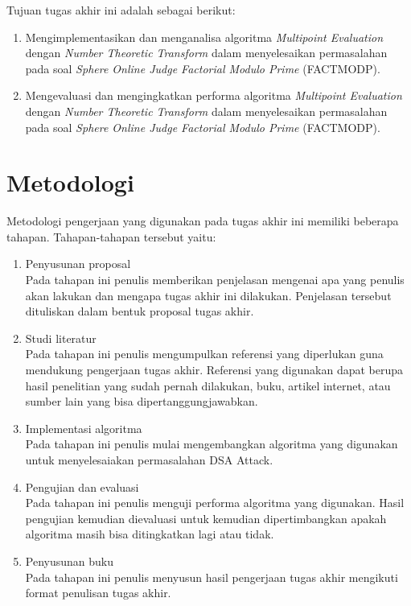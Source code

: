 Tujuan tugas akhir ini adalah sebagai berikut:

\begin{enumerate}
\item Mengimplementasikan dan menganalisa algoritma \textit{Multipoint Evaluation} dengan \textit{Number Theoretic Transform} dalam menyelesaikan permasalahan pada soal \textit{Sphere Online Judge Factorial Modulo Prime} (FACTMODP\cite{factmodp}).
\item Mengevaluasi dan mengingkatkan performa algoritma \textit{Multipoint Evaluation} dengan \textit{Number Theoretic Transform} dalam menyelesaikan permasalahan pada soal \textit{Sphere Online Judge Factorial Modulo Prime} (FACTMODP\cite{factmodp}).
\end{enumerate}

\section {Metodologi}

Metodologi pengerjaan yang digunakan pada tugas akhir ini memiliki beberapa tahapan. Tahapan-tahapan tersebut yaitu:

\begin{enumerate}
\item Penyusunan proposal\\
Pada tahapan ini penulis memberikan penjelasan mengenai apa yang penulis akan lakukan dan mengapa tugas akhir ini dilakukan. Penjelasan tersebut dituliskan dalam bentuk proposal tugas akhir.
\item Studi literatur\\
Pada tahapan ini penulis mengumpulkan referensi yang diperlukan guna mendukung pengerjaan tugas akhir. Referensi yang digunakan dapat berupa hasil penelitian yang sudah pernah dilakukan, buku, artikel internet, atau sumber lain yang bisa dipertanggungjawabkan.
\item Implementasi algoritma\\
Pada tahapan ini penulis mulai mengembangkan algoritma yang digunakan untuk menyelesaiakan permasalahan DSA Attack.
\item Pengujian dan evaluasi\\
Pada tahapan ini penulis menguji performa algoritma yang digunakan. Hasil pengujian kemudian dievaluasi untuk kemudian dipertimbangkan apakah algoritma masih bisa ditingkatkan lagi atau tidak.
\item Penyusunan buku\\
Pada tahapan ini penulis menyusun hasil pengerjaan tugas akhir mengikuti format penulisan tugas akhir.
\end{enumerate}

